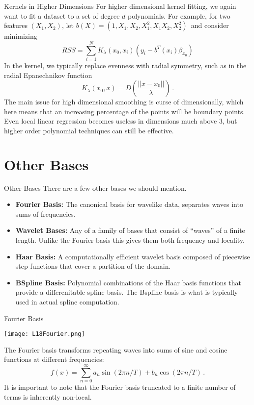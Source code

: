 \documentclass[10pt, table, dvipsnames,xcdraw,handout]{beamer}
\begin{document}
\begin{frame}[fragile]{Kernels in Higher Dimensions}
For higher dimensional kernel fitting, we again want to fit a dataset to a set of degree $d$ polynomials. For example, for two features $(X_1,X_2)$, let $b(X) = (1,X_1,X_2,X_1^2,X_1X_2,X_2^2)$\, and consider minimizing
$$
RSS = \sum_{i=1}^NK_\lambda(x_0,x_i)(y_i - b^T(x_i)\beta_{x_0})
$$\pause
In the kernel, we typically replace evenness with radial symmetry, such as in the radial Epanechnikov function
$$
K_\lambda(x_0,x) = D\left(\frac{||x-x_0||}{\lambda}\right)\,.
$$\pause 
The main issue for high dimensional smoothing is curse of dimensionally, which here means that an increasing percentage of the points will be boundary points. \pause Even local linear regression becomes useless in dimensions much above 3, but higher order polynomial techniques can still be effective. 
\end{frame}



\section{Other Bases}


\begin{frame}[fragile]{Other Bases}
There are a few other bases we should mention.

\begin{itemize}
\item[] \textbf{Fourier Basis:} The canonical basis for wavelike data, separates waves into sums of frequencies.\pause 
\item[] \textbf{Wavelet Bases:} Any of a family of bases that consist of ``waves'' of a finite length. Unlike the Fourier basis this gives them both frequency and locality. \pause
\item[] \textbf{Haar Basis:} A computationally efficient wavelet basis composed of piecewise step functions that cover a partition of the domain. \pause
\item[] \textbf{BSpline Basis:} Polynomial combinations of the Haar basis functions that provide a differenitable spline basis. The Bspline basis is what is typically used in actual spline computation. 
\end{itemize}
\end{frame}



\begin{frame}[fragile]{Fourier Basis}
  \begin{minipage}[t][0.5\textheight][t]{\textwidth}
	\centering \texttt{[image: L18Fourier.png]} 
  \end{minipage}
  \vfill
\begin{minipage}[t][0.5\textheight][t]{\textwidth}
The Fourier basis transforms repeating waves into sums of sine and cosine functions at different frequencies:
$$
f(x) = \sum_{n=0}^\infty 	a_n\sin(2\pi n/T) + b_n\cos(2\pi n/T) \,.
$$\pause
It is important to note that the Fourier basis truncated to a finite number of terms is inherently non-local. 
\end{minipage}
\end{frame}
\end{document}
